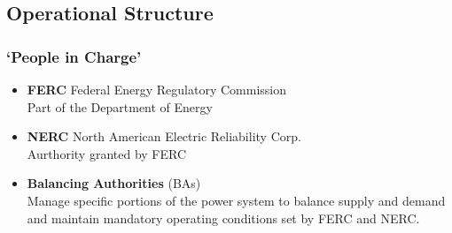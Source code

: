 \documentclass[14pt, unknownkeysallowed]{beamer}
\begin{document}
\subsection{Operational Structure}
\begin{frame}
\frametitle{`People in Charge'}
\begin{itemize}
\item \textbf{FERC}{ \footnotesize Federal Energy Regulatory Commission}\\
 Part of the Department of Energy
\item \textbf{NERC}{ \footnotesize
 North American Electric Reliability Corp.}\\
 Aurthority granted by FERC
 \item \textbf{Balancing Authorities} (BAs) \\
 Manage specific portions of the power system to balance supply and demand and maintain mandatory operating conditions set by FERC and NERC. %
\end{itemize}
\end{frame}
\end{document}
